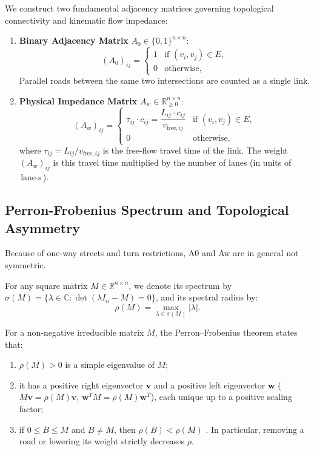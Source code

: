 \documentclass[journal]{IEEEtran}
\begin{document}
We construct two fundamental adjacency matrices governing topological connectivity and kinematic flow impedance:
\begin{enumerate}
    \item \textbf{Binary Adjacency Matrix} $A_0 \in \{0, 1\}^{n \times n}$:
    \begin{equation}
    (A_0)_{ij} = \begin{cases} 1 & \text{if } (v_i, v_j) \in E, \\ 0 & \text{otherwise,} \end{cases}
    \label{eq:binary_A}
    \end{equation}
    Parallel roads between the same two intersections are counted as a single link.
    \item \textbf{Physical Impedance Matrix} $A_w \in \mathbb{R}_{\ge 0}^{n \times n}$:
    \begin{equation}
    (A_w)_{ij} = \begin{cases} \tau_{ij} \cdot c_{ij} = \dfrac{L_{ij} \cdot c_{ij}}{v_{\text{free}, ij}} & \text{if } (v_i, v_j) \in E, \\ 0 & \text{otherwise,} \end{cases}
    \label{eq:adjacency}
    \end{equation}
    where $\tau_{ij} = L_{ij} / v_{\text{free}, ij}$ is the free-flow travel time of the link. The weight $(A_w)_{ij}$ is this travel time multiplied by the number of lanes (in units of $\text{lane}\cdot\text{s}$).
\end{enumerate}

\subsection{Perron-Frobenius Spectrum and Topological Asymmetry}
Because of one-way streets and turn restrictions, A0 and Aw are in general not symmetric.

For any square matrix $M \in \mathbb{R}^{n \times n}$, we denote its spectrum by $\sigma(M) = \{ \lambda \in \mathbb{C} : \det(\lambda I_n - M) = 0 \}$, and its spectral radius by:
\begin{equation}
\rho(M) = \max_{\lambda \in \sigma(M)} |\lambda|.
\label{eq:spectral_radius_def}
\end{equation}

For a non-negative irreducible matrix $M$, the Perron--Frobenius theorem \cite{Horn2013, Berman1994} states that:
\begin{enumerate}
    \item $\rho(M) > 0$ is a simple eigenvalue of $M$;
    \item it has a positive right eigenvector $\mathbf{v}$ and a positive left eigenvector $\mathbf{w}$ ($M \mathbf{v} = \rho(M) \mathbf{v}$, $\mathbf{w}^T M = \rho(M) \mathbf{w}^T$), each unique up to a positive scaling factor;
    \item if $0 \le B \le M$ and $B \neq M$, then $\rho(B) < \rho(M)$ \cite{Horn2013, Berman1994}. In particular, removing a road or lowering its weight strictly decreases $\rho$.
\end{enumerate}
\end{document}
